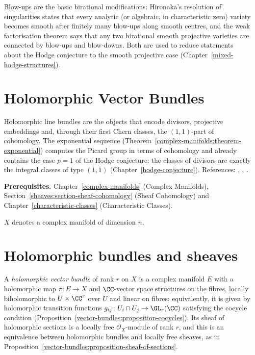 \begin{remark}\label{complex-manifolds:remark-blowup-birational}
Blow-ups are the basic birational modifications: Hironaka's resolution of singularities states that every analytic (or algebraic, in characteristic zero) variety becomes smooth after finitely many blow-ups
along smooth centres, and the weak factorisation theorem says that any two birational smooth projective varieties are connected by blow-ups and blow-downs. Both are used to reduce statements about the Hodge
conjecture to the smooth projective case (Chapter~\ref{mixed-hodge-structures}).
\end{remark}

\section{Holomorphic Vector Bundles}\label{complex-manifolds:section-holomorphic-bundles}
Holomorphic line bundles are the objects that encode divisors, projective embeddings and, through their first Chern classes, the
$(1,1)$-part of cohomology. The exponential sequence (Theorem~\ref{complex-manifolds:theorem-exponential}) computes the Picard
group in terms of cohomology and already contains the case $p = 1$ of the Hodge conjecture: the classes of divisors are exactly the
integral classes of type $(1,1)$ (Chapter~\ref{hodge-conjecture}). References: \cite[Chapter 1]{griffiths-harris},
\cite[Chapters 2--4]{huybrechts-complex}, \cite[Chapter 4]{voisin-hodge-1}.

\noindent\textbf{Prerequisites.} Chapter~\ref{complex-manifolds} (Complex Manifolds), Section~\ref{sheaves:section-sheaf-cohomology} (Sheaf
Cohomology) and Chapter~\ref{characteristic-classes} (Characteristic Classes).

$X$ denotes a complex manifold of dimension $n$.

\section{Holomorphic bundles and sheaves}\label{complex-manifolds:section-bundles}

\begin{definition}\label{complex-manifolds:definition-holomorphic-bundle}
A \emph{holomorphic vector bundle} of rank $r$ on $X$ is a complex manifold $E$ with a holomorphic map $\pi \colon E \to X$ and $\CC$-vector space structures on the fibres, locally biholomorphic to
$U \times \CC^r$ over $U$ and linear on fibres; equivalently, it is given by holomorphic transition functions $g_{ij} \colon U_i \cap U_j \to \GL_r(\CC)$ satisfying the cocycle condition
(Proposition~\ref{vector-bundles:proposition-cocycles}). Its sheaf of holomorphic sections is a locally free $\mathcal{O}_X$-module of rank $r$, and this is an equivalence between holomorphic bundles and
locally free sheaves, as in Proposition~\ref{vector-bundles:proposition-sheaf-of-sections}.
\end{definition}

